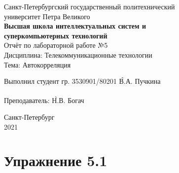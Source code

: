 \documentclass[a4paper, 14pt]{extarticle}
\begin{document}
    \begin{center}
        \begin{center}
            \hfill \break
            \normalsize{Санкт-Петербургский государственный политехнический}\\
            \normalsize{университет Петра Великого}\\
            \hfill \break
            \normalsize{\textbf{Высшая школа интеллектуальных систем и}}\\
            \normalsize{\textbf{суперкомпьютерных технологий}}\\
            \hfill \break
            \hfill \break
            \hfill \break
            \hfill \break
            \hfill \break
            \normalsize{Отчёт по лабораторной работе №5}\\
            \normalsize{Дисциплина: Телекоммуникационные технологии}\\
            \normalsize{Тема: Автокорреляция}\\
        \end{center}
        \hfill \break
        \hfill \break
        \hfill \break
        \hfill \break
        \hfill \break
        \hfill \break
        \hfill \break
        \hfill \break
        \hfill \break
        \hfill \break
        \begin{tabbing}
            Выполнил студент гр. 3530901/80201 \`В.А. Пучкина\\
            \\
            Преподаватель: \`Н.В. Богач\\
        \end{tabbing}
        \hfill \break
        \hfill \break
        \hfill \break
        \hfill \break
        \begin{center}
            Санкт-Петербург\\
            2021
        \end{center}
        \thispagestyle{empty}
    \end{center}

    \newpage
    \tableofcontents

    \newpage
    \listoffigures

    \newpage
    \lstlistoflistings

    \newpage
    \section{Упражнение 5.1}
    \label{sec:task1}
\end{document}
